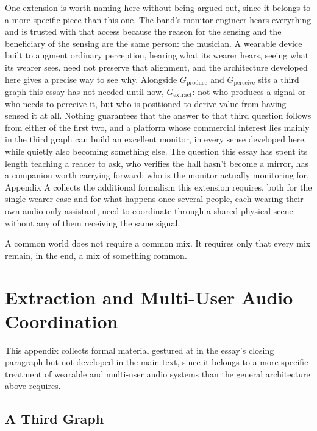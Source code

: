 \documentclass[12pt]{article}
\begin{document}
One extension is worth naming here without being argued out, since it belongs to a more specific piece than this one. The band's monitor engineer hears everything and is trusted with that access because the reason for the sensing and the beneficiary of the sensing are the same person: the musician. A wearable device built to augment ordinary perception, hearing what its wearer hears, seeing what its wearer sees, need not preserve that alignment, and the architecture developed here gives a precise way to see why. Alongside $G_{\mathrm{produce}}$ and $G_{\mathrm{perceive}}$ sits a third graph this essay has not needed until now, $G_{\mathrm{extract}}$: not who produces a signal or who needs to perceive it, but who is positioned to derive value from having sensed it at all. Nothing guarantees that the answer to that third question follows from either of the first two, and a platform whose commercial interest lies mainly in the third graph can build an excellent monitor, in every sense developed here, while quietly also becoming something else. The question this essay has spent its length teaching a reader to ask, who verifies the hall hasn't become a mirror, has a companion worth carrying forward: who is the monitor actually monitoring for. Appendix A collects the additional formalism this extension requires, both for the single-wearer case and for what happens once several people, each wearing their own audio-only assistant, need to coordinate through a shared physical scene without any of them receiving the same signal.

A common world does not require a common mix. It requires only that every mix remain, in the end, a mix of something common.

\appendix

\section{Extraction and Multi-User Audio Coordination}

This appendix collects formal material gestured at in the essay's closing paragraph but not developed in the main text, since it belongs to a more specific treatment of wearable and multi-user audio systems than the general architecture above requires.

\subsection{A Third Graph}
\end{document}
